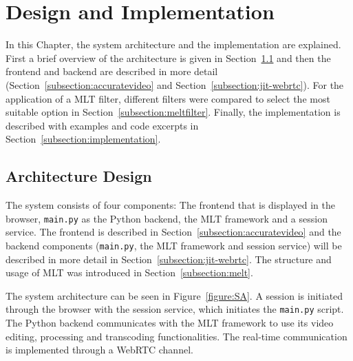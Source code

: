 \documentclass[../MasterThesis.tex]{subfiles}
\begin{document}
	
	
	
%
%
%
%
%
%
%
%
\newpage
\section{Design and Implementation} \label{section:designandimplementation}

In this Chapter, the system architecture and the implementation are explained. First a brief overview of the architecture is given in Section~\ref{subsection:architecturedesign} and then the frontend and backend are described in more detail (Section~\ref{subsection:accuratevideo} and Section~\ref{subsection:jit-webrtc}).
For the application of a MLT filter, different filters were compared to select the most suitable option in Section~\ref{subsection:meltfilter}. Finally, the implementation is described with examples and code excerpts in Section~\ref{subsection:implementation}.





\subsection{Architecture Design} \label{subsection:architecturedesign}


The system consists of four components: The frontend that is displayed in the browser, \texttt{main.py} as the Python backend, the MLT framework and a session service. The frontend is described in Section~\ref{subsection:accuratevideo} and the backend components (\texttt{main.py}, the MLT framework and session service) will be described in more detail in Section~\ref{subsection:jit-webrtc}. The structure and usage of MLT was introduced in Section~\ref{subsection:melt}.


The system architecture can be seen in Figure~\ref{figure:SA}.
A session is initiated through the browser with the session service, which initiates the \texttt{main.py} script.
The Python backend communicates with the MLT framework to use its video editing, processing and transcoding functionalities. The real-time communication is implemented through a WebRTC channel.
\end{document}
